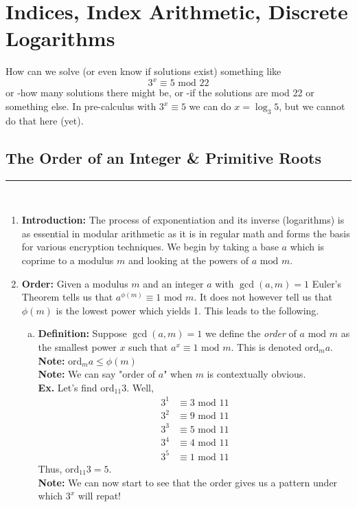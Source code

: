 \documentclass[class=article, crop=false]{standalone}
\begin{document}
    
\section{Indices, Index Arithmetic, Discrete Logarithms}
How can we solve (or even know if solutions exist) something like $$3^x \equiv 5\mbox{ mod }22$$
or -how many solutions there might be, or -if the solutions are mod 22 or something else.
In pre-calculus with $3^x \equiv 5$ we can do $x=\log_3 5$, but we cannot do that here (yet).
\subsection{The Order of an Integer \& Primitive Roots}
\rule{\textwidth}{1pt}\\
\begin{enumerate}
\item \textbf{Introduction:} 
The process of exponentiation and its inverse (logarithms) is as essential in modular arithmetic as it 
is in regular math and forms the basis for various encryption techniques. We begin by taking a base $a$
which is coprime to a modulus $m$ and looking at the powers of $a\mbox{ mod }m$.

\item \textbf{Order:}
Given a modulus $m$ and an integer $a$ with $\gcd(a,m)=1$ Euler's Theorem tells us that
$a^{\phi(m)} \equiv 1\mbox{ mod }m$. It does not however tell us that $\phi(m)$ is the lowest
power which yields 1. This leads to the following.
\begin{enumerate}[(a)]
	\item \textbf{Definition:} Suppose $\gcd(a,m)=1$ we define the \emph{order} of $a\mbox{ mod }m$
	as the smallest power $x$ such that $a^x \equiv 1\mbox{ mod }m$. This is denoted $\mbox{ord}_m a$. \\
	\textbf{Note:} $\mbox{ord}_m a \leq \phi(m)$ \\
	\textbf{Note:} We can say "order of $a$" when $m$ is contextually obvious.\\
	\textbf{Ex.} Let's find $\mbox{ord}_{11} 3$. Well,
	\begin{align*}
		3^1 &\equiv 3\mbox{ mod }11 \\
		3^2 &\equiv 9\mbox{ mod }11 \\
		3^3 &\equiv 5\mbox{ mod }11 \\
		3^4 &\equiv 4\mbox{ mod }11 \\
		3^5 &\equiv 1\mbox{ mod }11
	\end{align*}
	Thus, $\mbox{ord}_{11} 3 = 5$. \\
	\textbf{Note:} We can now start to see that the order gives us a pattern under which
	$3^x$ will repat!
	

\end{enumerate}
\end{enumerate}
\end{document}
